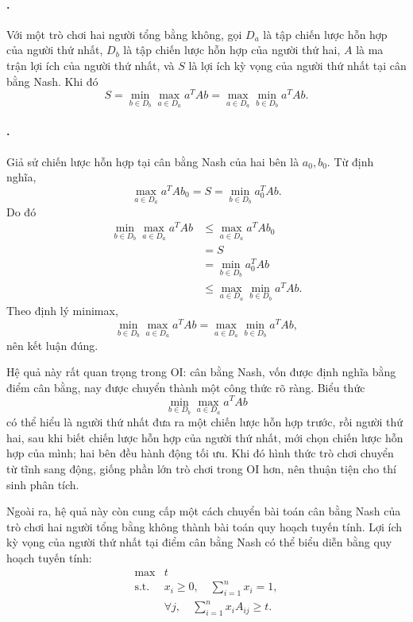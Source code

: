 \documentclass[11pt]{article}
\begin{document}
\paragraph{.}
Với một trò chơi hai người tổng bằng không, gọi \(D_a\) là tập chiến lược hỗn
hợp của người thứ nhất, \(D_b\) là tập chiến lược hỗn hợp của người thứ hai,
\(A\) là ma trận lợi ích của người thứ nhất, và \(S\) là lợi ích kỳ vọng của
người thứ nhất tại cân bằng Nash. Khi đó
\[
  S=\min_{b\in D_b}\max_{a\in D_a}a^TAb
  =
  \max_{a\in D_a}\min_{b\in D_b}a^TAb.
\]

\paragraph{.}
Giả sử chiến lược hỗn hợp tại cân bằng Nash của hai bên là \(a_0,b_0\). Từ định
nghĩa,
\[
  \max_{a\in D_a}a^TAb_0=S=\min_{b\in D_b}a_0^TAb.
\]
Do đó
\[
\begin{aligned}
  \min_{b\in D_b}\max_{a\in D_a}a^TAb
  &\le \max_{a\in D_a}a^TAb_0\\
  &=S\\
  &=\min_{b\in D_b}a_0^TAb\\
  &\le \max_{a\in D_a}\min_{b\in D_b}a^TAb.
\end{aligned}
\]
Theo định lý minimax,
\[
  \min_{b\in D_b}\max_{a\in D_a}a^TAb
  =
  \max_{a\in D_a}\min_{b\in D_b}a^TAb,
\]
nên kết luận đúng.

Hệ quả này rất quan trọng trong OI: cân bằng Nash, vốn được định nghĩa bằng
điểm cân bằng, nay được chuyển thành một công thức rõ ràng. Biểu thức
\[
  \min_{b\in D_b}\max_{a\in D_a}a^TAb
\]
có thể hiểu là người thứ nhất đưa ra một chiến lược hỗn hợp trước, rồi người
thứ hai, sau khi biết chiến lược hỗn hợp của người thứ nhất, mới chọn chiến
lược hỗn hợp của mình; hai bên đều hành động tối ưu. Khi đó hình thức trò chơi
chuyển từ tĩnh sang động, giống phần lớn trò chơi trong OI hơn, nên thuận tiện
cho thí sinh phân tích.

Ngoài ra, hệ quả này còn cung cấp một cách chuyển bài toán cân bằng Nash của
trò chơi hai người tổng bằng không thành bài toán quy hoạch tuyến tính. Lợi ích
kỳ vọng của người thứ nhất tại điểm cân bằng Nash có thể biểu diễn bằng quy
hoạch tuyến tính:
\[
\begin{array}{ll}
  \max & t\\
  \text{s.t.} &
  x_i\ge 0,\quad \displaystyle\sum_{i=1}^{n}x_i=1,\\
  & \forall j,\quad \displaystyle\sum_{i=1}^{n}x_i A_{ij}\ge t.
\end{array}
\]
\end{document}
